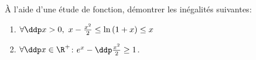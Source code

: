 
\begin{exercice} 
\`{A} l'aide d'une \'etude de fonction, d\'emontrer les in\'egalit\'es suivantes:
\begin{enumerate}
\item $\forall \ddp x>0,\ x-\frac{x^2}{2}\leq \ln{(1+x)}\leq x$
\item $\forall \ddp x\in\R^+$: $e^x-\ddp\frac{x^2}{2}\geq 1$.
\end{enumerate}
\end{exercice}